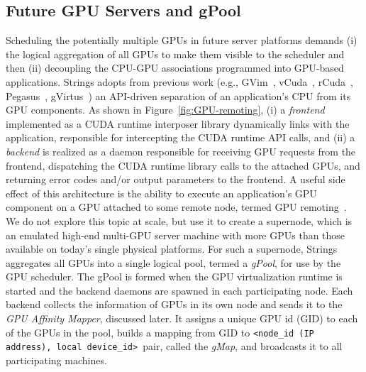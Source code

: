 \subsection{Future GPU Servers and gPool}
Scheduling the potentially multiple GPUs in future server platforms demands (i) the logical aggregation of all GPUs to make them visible to the scheduler and then (ii) decoupling the CPU-GPU associations programmed into GPU-based applications. Strings adopts from previous work (e.g., GVim~\cite{gvim}, vCuda~\cite{vcuda}, rCuda~\cite{rcuda}, Pegasus~\cite{pegasus}, gVirtus~\cite{gvirtus}) an API-driven separation of an application's CPU from its GPU components. As shown in Figure~\ref{fig:GPU-remoting}, (i) a \textit{frontend} implemented as a CUDA runtime interposer library dynamically links with the application, responsible for intercepting the CUDA runtime API calls, and (ii) a \textit{backend} is realized as a daemon responsible for receiving GPU requests from the frontend, dispatching the CUDA runtime library calls to the attached GPUs, and returning error codes and/or output parameters to the frontend. A useful side effect of this architecture is the ability to execute an application's GPU component on a GPU attached to some remote node, termed GPU remoting~\cite{shadowfax}. We do not explore this topic at scale, but use it to create a supernode, which is an emulated high-end multi-GPU server machine   with  more  GPUs  than  those  available  on  today's single physical platforms. For such a supernode, Strings aggregates all GPUs into a single logical pool, termed a \textit{gPool}, for use by the GPU scheduler. The gPool is formed when the GPU virtualization runtime is started and the backend daemons are spawned in each participating node. Each backend collects the information of GPUs in its own node and sends it to the \textit{GPU Affinity Mapper}, discussed later. It assigns a unique GPU id (GID) to each of the GPUs in the pool, builds a mapping from GID to  \verb|<node_id (IP address), local device_id> |pair, called the \textit{gMap}, and broadcasts it to all participating machines.  

